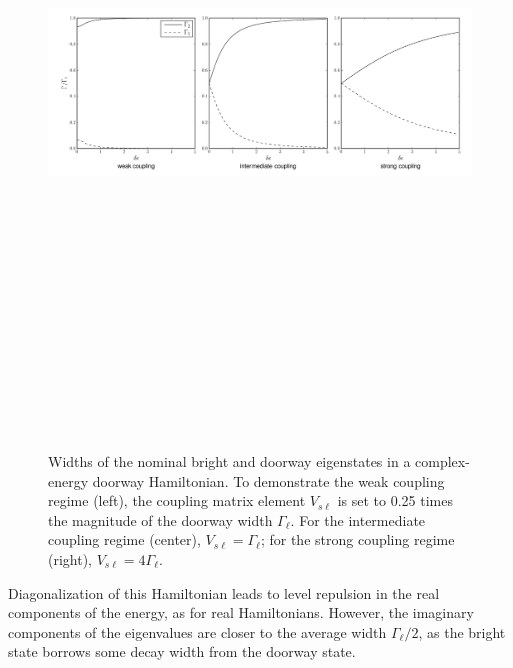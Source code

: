 \begin{figure}
  \caption{Widths of the nominal bright and doorway eigenstates in a
    complex-energy doorway Hamiltonian. To demonstrate the weak
    coupling regime (left), the coupling matrix element $V_{s\ell}$ is
    set to 0.25 times the magnitude of the doorway width
    $\Gamma_{\ell}$. For the intermediate coupling regime (center),
    $V_{s\ell}=\Gamma_{\ell}$; for the strong coupling regime (right),
    $V_{s\ell}=4\Gamma_{\ell}$.}
  \label{fig:complex-widths}
  \centering
  \includegraphics[angle=90, height=7.4in]{complex-widths.png}
\end{figure}

Diagonalization of this Hamiltonian leads to level repulsion in the
real components of the energy, as for real Hamiltonians.  However, the
imaginary components of the eigenvalues are closer to the average
width $\Gamma_{\ell}/2$, as the bright state borrows some decay width
from the doorway state.

